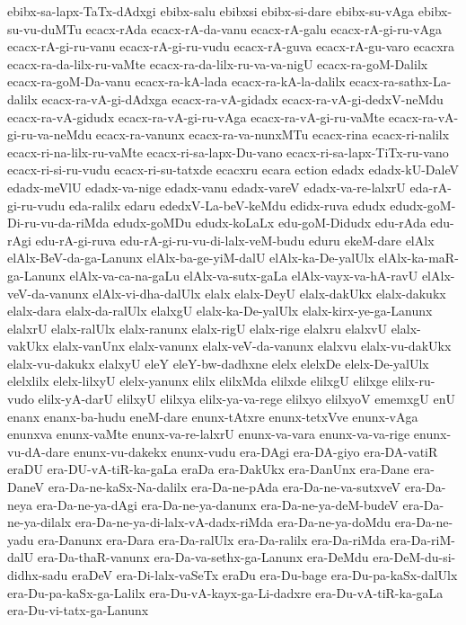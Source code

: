 {ebibx-sa-lapx-TaTx-dAdxgi
ebibx-salu
ebibxsi
ebibx-si-dare
ebibx-su-vAga
ebibx-su-vu-duMTu
ecacx-rAda
ecacx-rA-da-vanu
ecacx-rA-galu
ecacx-rA-gi-ru-vAga
ecacx-rA-gi-ru-vanu
ecacx-rA-gi-ru-vudu
ecacx-rA-guva
ecacx-rA-gu-varo
ecacxra
ecacx-ra-da-lilx-ru-vaMte
ecacx-ra-da-lilx-ru-va-va-nigU
ecacx-ra-goM-Dalilx
ecacx-ra-goM-Da-vanu
ecacx-ra-kA-lada
ecacx-ra-kA-la-dalilx
ecacx-ra-sathx-La-dalilx
ecacx-ra-vA-gi-dAdxga
ecacx-ra-vA-gidadx
ecacx-ra-vA-gi-dedxV-neMdu
ecacx-ra-vA-gidudx
ecacx-ra-vA-gi-ru-vAga
ecacx-ra-vA-gi-ru-vaMte
ecacx-ra-vA-gi-ru-va-neMdu
ecacx-ra-vanunx
ecacx-ra-va-nunxMTu
ecacx-rina
ecacx-ri-nalilx
ecacx-ri-na-lilx-ru-vaMte
ecacx-ri-sa-lapx-Du-vano
ecacx-ri-sa-lapx-TiTx-ru-vano
ecacx-ri-si-ru-vudu
ecacx-ri-su-tatxde
ecacxru
ecara
ection
edadx
edadx-kU-DaleV
edadx-meVlU
edadx-va-nige
edadx-vanu
edadx-vareV
edadx-va-re-lalxrU
eda-rA-gi-ru-vudu
eda-ralilx
edaru
ededxV-La-beV-keMdu
edidx-ruva
edudx
edudx-goM-Di-ru-vu-da-riMda
edudx-goMDu
edudx-koLaLx
edu-goM-Didudx
edu-rAda
edu-rAgi
edu-rA-gi-ruva
edu-rA-gi-ru-vu-di-lalx-veM-budu
eduru
ekeM-dare
elAlx
elAlx-BeV-da-ga-Lanunx
elAlx-ba-ge-yiM-dalU
elAlx-ka-De-yalUlx
elAlx-ka-maR-ga-Lanunx
elAlx-va-ca-na-gaLu
elAlx-va-sutx-gaLa
elAlx-vayx-va-hA-ravU
elAlx-veV-da-vanunx
elAlx-vi-dha-dalUlx
elalx
elalx-DeyU
elalx-dakUkx
elalx-dakukx
elalx-dara
elalx-da-ralUlx
elalxgU
elalx-ka-De-yalUlx
elalx-kirx-ye-ga-Lanunx
elalxrU
elalx-ralUlx
elalx-ranunx
elalx-rigU
elalx-rige
elalxru
elalxvU
elalx-vakUkx
elalx-vanUnx
elalx-vanunx
elalx-veV-da-vanunx
elalxvu
elalx-vu-dakUkx
elalx-vu-dakukx
elalxyU
eleY
eleY-bw-dadhxne
elelx
elelxDe
elelx-De-yalUlx
elelxlilx
elelx-lilxyU
elelx-yanunx
elilx
elilxMda
elilxde
elilxgU
elilxge
elilx-ru-vudo
elilx-yA-darU
elilxyU
elilxya
elilx-ya-va-rege
elilxyo
elilxyoV
ememxgU
enU
enanx
enanx-ba-hudu
eneM-dare
enunx-tAtxre
enunx-tetxVve
enunx-vAga
enunxva
enunx-vaMte
enunx-va-re-lalxrU
enunx-va-vara
enunx-va-va-rige
enunx-vu-dA-dare
enunx-vu-dakekx
enunx-vudu
era-DAgi
era-DA-giyo
era-DA-vatiR
eraDU
era-DU-vA-tiR-ka-gaLa
eraDa
era-DakUkx
era-DanUnx
era-Dane
era-DaneV
era-Da-ne-kaSx-Na-dalilx
era-Da-ne-pAda
era-Da-ne-va-sutxveV
era-Da-neya
era-Da-ne-ya-dAgi
era-Da-ne-ya-danunx
era-Da-ne-ya-deM-budeV
era-Da-ne-ya-dilalx
era-Da-ne-ya-di-lalx-vA-dadx-riMda
era-Da-ne-ya-doMdu
era-Da-ne-yadu
era-Danunx
era-Dara
era-Da-ralUlx
era-Da-ralilx
era-Da-riMda
era-Da-riM-dalU
era-Da-thaR-vanunx
era-Da-va-sethx-ga-Lanunx
era-DeMdu
era-DeM-du-si-didhx-sadu
eraDeV
era-Di-lalx-vaSeTx
eraDu
era-Du-bage
era-Du-pa-kaSx-dalUlx
era-Du-pa-kaSx-ga-Lalilx
era-Du-vA-kayx-ga-Li-dadxre
era-Du-vA-tiR-ka-gaLa
era-Du-vi-tatx-ga-Lanunx
}
